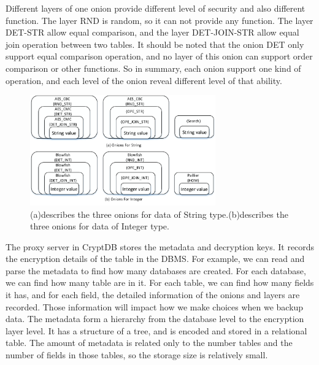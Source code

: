 Different layers of one onion provide different level of security and also different function. The layer RND is random, so it can not provide any function. The layer DET-STR allow equal comparison, and the layer DET-JOIN-STR allow equal join operation between two tables. It should be noted that the onion DET only support equal comparison operation, and no layer of this onion can support order comparison or other functions. So in summary, each onion support one kind of operation, and each level of the onion reveal different level of that ability.





\begin{figure}[tb]
\centering
\includegraphics[width=8cm]{images/Onions.pdf}
\caption{(a)describes the three onions for data of String type.(b)describes the three onions for data of Integer type.}
\label{fig:stack2}
\end{figure}


The proxy server in CryptDB stores the metadata and decryption keys. It records the encryption details of the table in the DBMS. For example, we can read and parse the metadata to find how many databases are created. For each database, we can find how many table are in it. For each table, we can find how many fields it has, and for each field, the detailed information of the onions and layers are recorded. Those information will impact how we make choices when we backup data. The metadata form a hierarchy from the database level to the encryption layer level. It has a structure of a tree, and is encoded and stored in a relational table. The amount of metadata is related only to the number tables and the number of fields in those tables, so the storage size is relatively small.







